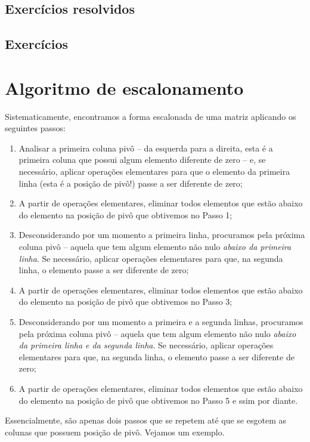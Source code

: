 \subsection*{Exercícios resolvidos}

\construirExeresol

\subsection*{Exercícios}

\construirExer


\section{Algoritmo de escalonamento}

Sistematicamente, encontramos a forma escalonada de uma matriz aplicando os seguintes passos:
\begin{enumerate}
  \item Analisar a primeira coluna pivô -- da esquerda para a direita, esta é a primeira coluna que possui algum elemento diferente de zero -- e, se necessário, aplicar operações elementares para que o elemento da primeira linha (esta é a posição de pivô!) passe a ser diferente de zero;
  \item A partir de operações elementares, eliminar todos elementos que estão abaixo do elemento na posição de pivô que obtivemos no Passo 1;
  \item Desconsiderando por um momento a primeira linha, procuramos pela próxima coluna pivô -- aquela que tem algum elemento não nulo \textit{abaixo da primeira linha}. Se necessário, aplicar operações elementares para que, na segunda linha, o elemento passe a ser diferente de zero;
  \item A partir de operações elementares, eliminar todos elementos que estão abaixo do elemento na posição de pivô que obtivemos no Passo 3;
  \item Desconsiderando por um momento a primeira e a segunda linhas, procuramos pela próxima coluna pivô -- aquela que tem algum elemento não nulo \textit{abaixo da primeira linha e da segunda linha}. Se necessário, aplicar operações elementares para que, na segunda linha, o elemento passe a ser diferente de zero;
  \item A partir de operações elementares, eliminar todos elementos que estão abaixo do elemento na posição de pivô que obtivemos no Passo 5 e ssim por diante.
\end{enumerate} Essencialmente, são apenas dois passos que se repetem até que se esgotem as colunas que possuem posição de pivô. Vejamos um exemplo.

